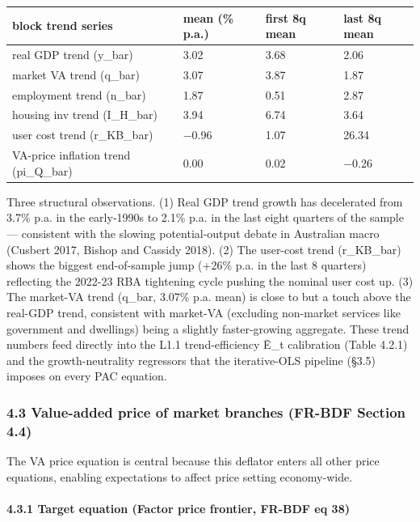 \documentclass[
]{article}
\newcounter{none} %
\begin{document}
{\def\LTcaptype{none} %
\begin{longtable}[]{@{}llll@{}}
\toprule\noalign{}
block trend series & mean (\% p.a.) & first 8q mean & last 8q mean \\
\midrule\noalign{}
\endhead
\bottomrule\noalign{}
\endlastfoot
real GDP trend (y\_bar) & 3.02 & 3.68 & 2.06 \\
market VA trend (q\_bar) & 3.07 & 3.87 & 1.87 \\
employment trend (n\_bar) & 1.87 & 0.51 & 2.87 \\
housing inv trend (I\_H\_bar) & 3.94 & 6.74 & 3.64 \\
user cost trend (r\_KB\_bar) & −0.96 & 1.07 & 26.34 \\
VA-price inflation trend (pi\_Q\_bar) & 0.00 & 0.02 & −0.26 \\
\end{longtable}
}

Three structural observations. (1) Real GDP trend growth has decelerated
from 3.7\% p.a. in the early-1990s to 2.1\% p.a. in the last eight
quarters of the sample --- consistent with the slowing potential-output
debate in Australian macro (Cusbert 2017, Bishop and Cassidy 2018). (2)
The user-cost trend (r\_KB\_bar) shows the biggest end-of-sample jump
(+26\% p.a. in the last 8 quarters) reflecting the 2022-23 RBA
tightening cycle pushing the nominal user cost up. (3) The market-VA
trend (q\_bar, 3.07\% p.a. mean) is close to but a touch above the
real-GDP trend, consistent with market-VA (excluding non-market services
like government and dwellings) being a slightly faster-growing
aggregate. These trend numbers feed directly into the L1.1
trend-efficiency Ē\_t calibration (Table 4.2.1) and the
growth-neutrality regressors that the iterative-OLS pipeline (§3.5)
imposes on every PAC equation.

\subsubsection{4.3 Value-added price of market branches (FR-BDF Section
4.4)}\label{value-added-price-of-market-branches-fr-bdf-section-4.4}

The VA price equation is central because this deflator enters all other
price equations, enabling expectations to affect price setting
economy-wide.

\paragraph{4.3.1 Target equation (Factor price frontier, FR-BDF eq
38)}\label{target-equation-factor-price-frontier-fr-bdf-eq-38}
\end{document}
